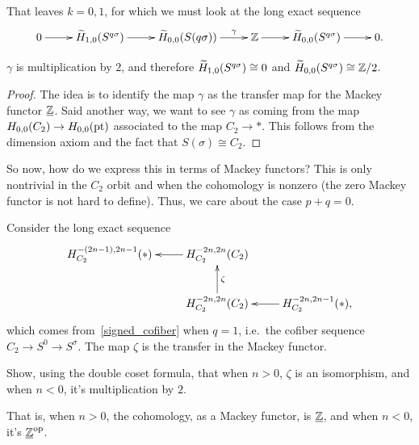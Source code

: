 That leaves $k = 0,1$, for which we must look at the long exact sequence
\[\xymatrix{
	0\ar[r] & \wH_{1,0}(S^{q\sigma})\ar[r] & \wH_{0,0}(S(q\sigma))\ar[r]^-\gamma &\Z\ar[r] &
	\wH_{0,0}(S^{q\sigma})\ar[r] & 0.
}\]
\begin{claim}
$\gamma$ is multiplication by $2$, and therefore $\widetilde H_{1,0}(S^{q\sigma})\cong 0$ and
$\widetilde H_{0,0}(S^{q\sigma})\cong\mathbb Z/2$.
\end{claim}
\begin{proof}
The idea is to identify the map $\gamma$ as the transfer map for the Mackey functor $\underline{\mathbb Z}$. Said another
way, we want to see $\gamma$ as coming from the map $H_{0,0}(C_2)\to H_{0,0}(\mathrm{pt})$ associated to the map $C_2\to
*$. This follows from the dimension axiom and the fact that $S(\sigma)\cong C_2$.
\end{proof}
So now, how do we express this in terms of Mackey functors? This is only nontrivial in the $C_2$ orbit and when the
cohomology is nonzero (the zero Mackey functor is not hard to define). Thus, we care about the case $p+q = 0$.

Consider the long exact sequence
\[\xymatrix{
	H_{C_2}^{-(2n-1), 2n-1}(*) & H_{C_2}^{-2n,2n}(C_2)\ar[l]\\
	& H_{C_2}^{-2n,2n}(C_2)\ar[u]_\zeta & H_{C_2}^{-2n,2n-1}(*),\ar[l]
}\]
which comes from~\eqref{signed_cofiber} when $q = 1$, i.e.\ the cofiber sequence $C_2\to S^0\to S^\sigma$. The map
$\zeta$ is the transfer in the Mackey functor.
\begin{ex}
Show, using the double coset formula, that when $n > 0$, $\zeta$ is an isomorphism, and when $n < 0$, it's
multiplication by $2$.
\end{ex}
That is, when $n > 0$, the cohomology, as a Mackey functor, is $\underline{\mathbb Z}$, and when $n < 0$, it's
$\underline{\mathbb Z}^{\mathrm{op}}$.
